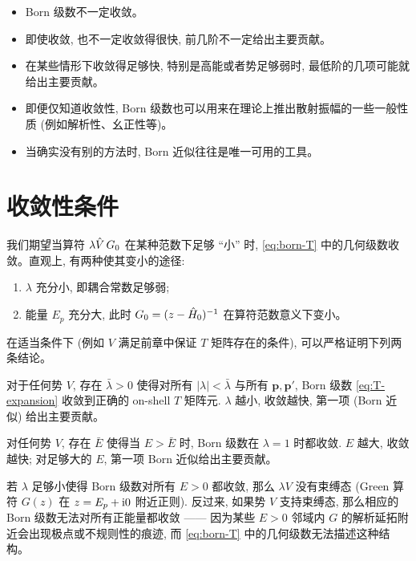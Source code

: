 \begin{remark}
\begin{itemize}
  \item Born 级数不一定收敛。
  \item 即使收敛, 也不一定收敛得很快, 前几阶不一定给出主要贡献。
  \item 在某些情形下收敛得足够快, 特别是高能或者势足够弱时, 最低阶的几项可能就给出主要贡献。
  \item 即便仅知道收敛性, Born 级数也可以用来在理论上推出散射振幅的一些一般性质 (例如解析性、幺正性等)。
  \item 当确实没有别的方法时, Born 近似往往是唯一可用的工具。
\end{itemize}
\end{remark}

\section{收敛性条件}\label{sec:convergence}

我们期望当算符 $\lambda\hat{V}\,G_0$ 在某种范数下足够 “小” 时, \eqref{eq:born-T} 中的几何级数收敛。直观上, 有两种使其变小的途径:
\begin{enumerate}
  \item $\lambda$ 充分小, 即耦合常数足够弱;
  \item 能量 $E_p$ 充分大, 此时 $G_0=(z-\hat{H}_0)^{-1}$ 在算符范数意义下变小。
\end{enumerate}
在适当条件下 (例如 $V$ 满足前章中保证 $T$ 矩阵存在的条件), 可以严格证明下列两条结论。

\begin{theorem}[弱耦合下的收敛性]\label{thm:weak-coupling}
对于任何势 $V$, 存在 $\bar\lambda>0$ 使得对所有 $|\lambda|<\bar\lambda$ 与所有 $\bm p,\bm p'$, Born 级数 \eqref{eq:T-expansion} 收敛到正确的 on-shell $T$ 矩阵元. $\lambda$ 越小, 收敛越快, 第一项 (Born 近似) 给出主要贡献。
\end{theorem}

\begin{theorem}[高能区的收敛性]\label{thm:high-energy}
对任何势 $V$, 存在 $\bar E$ 使得当 $E>\bar E$ 时, Born 级数在 $\lambda=1$ 时都收敛. $E$ 越大, 收敛越快; 对足够大的 $E$, 第一项 Born 近似给出主要贡献。
\end{theorem}

\begin{remark}[束缚态与收敛性的关系]
若 $\lambda$ 足够小使得 Born 级数对所有 $E>0$ 都收敛, 那么 $\lambda V$ 没有束缚态 (Green 算符 $G(z)$ 在 $z=E_p+\mathrm{i} 0$ 附近正则). 反过来, 如果势 $V$ 支持束缚态, 那么相应的 Born 级数无法对所有正能量都收敛 —— 因为某些 $E>0$ 邻域内 $G$ 的解析延拓附近会出现极点或不规则性的痕迹, 而 \eqref{eq:born-T} 中的几何级数无法描述这种结构。
\end{remark}

